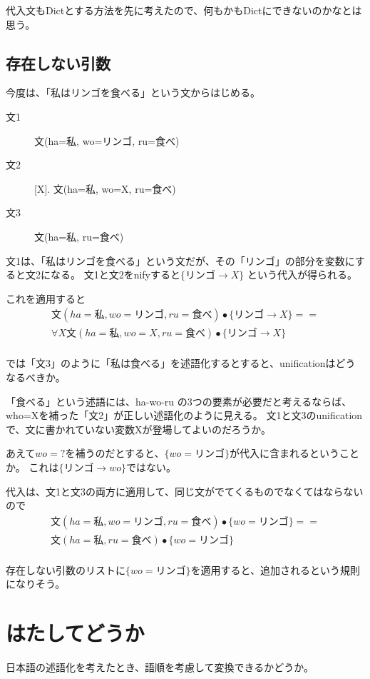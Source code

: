 \documentclass[10pt, oneside]{jarticle}   	%
\begin{document}
代入文もDictとする方法を先に考えたので、何もかもDictにできないのかなとは思う。

\subsection{存在しない引数}
今度は、「私はリンゴを食べる」という文からはじめる。
\begin{description}
\item[文1] 文(ha=私, wo=リンゴ, ru=食べ)
\item[文2] [X]. 文(ha=私, wo=X, ru=食べ)
\item[文3] 文(ha=私, ru=食べ)
\end{description}

文1は、「私はリンゴを食べる」という文だが、その「リンゴ」の部分を変数にすると文2になる。
文1と文2をnifyすると$\{リンゴ \to X\}$ という代入が得られる。

これを適用すると
\begin{eqnarray*}
文(ha=私, wo=リンゴ, ru=食べ) \bullet \{リンゴ \to X\} ==\\
\forall X 文(ha=私, wo=X, ru=食べ)\bullet\{リンゴ \to X\} \\
\end{eqnarray*}


では「文3」のように「私は食べる」を述語化するとすると、unificationはどうなるべきか。

「食べる」という述語には、ha-wo-ru の3つの要素が必要だと考えるならば、who=Xを補った「文2」が正しい述語化のように見える。
文1と文3のunificationで、文に書かれていない変数Xが登場してよいのだろうか。

あえて$wo=?$を補うのだとすると、$\{wo=リンゴ\}$が代入に含まれるということか。
これは$\{リンゴ \to wo\}$ではない。

代入は、文1と文3の両方に適用して、同じ文がでてくるものでなくてはならないので
\begin{eqnarray*}
文(ha=私, wo=リンゴ, ru=食べ) \bullet \{wo=リンゴ\} ==\\
文(ha=私, ru=食べ)\bullet\{wo=リンゴ\} \\
\end{eqnarray*}

存在しない引数のリストに$\{wo=リンゴ\} $を適用すると、追加されるという規則になりそう。

\section{はたしてどうか}
日本語の述語化を考えたとき、語順を考慮して変換できるかどうか。
\end{document}
